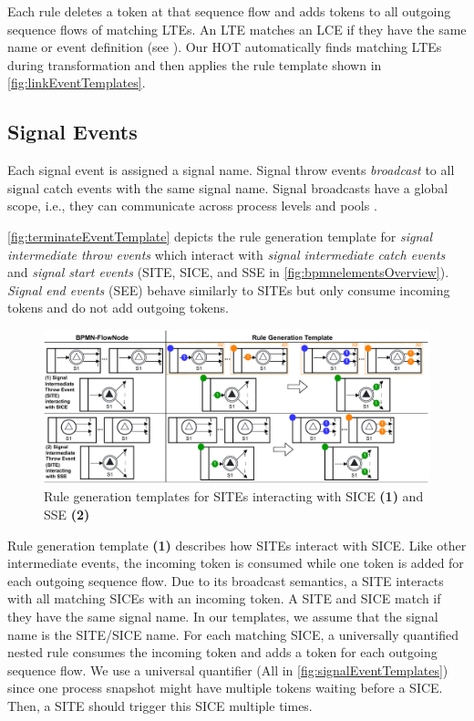 \documentclass{lmcs} %
\begin{document}
Each rule deletes a token at that sequence flow and adds tokens to all outgoing sequence flows of matching LTEs.
An LTE matches an LCE if they have the same name or event definition (see \cite{objectmanagementgroupBusinessProcessModel2013}).
Our HOT automatically finds matching LTEs during transformation and then applies the rule template shown in \autoref{fig:linkEventTemplates}.

\subsection{Signal Events}
Each signal event is assigned a signal name.
Signal throw events \textit{broadcast} to all signal catch events with the same signal name.
Signal broadcasts have a global scope, i.e., they can communicate across process levels and pools \cite{objectmanagementgroupBusinessProcessModel2013}.

\autoref{fig:terminateEventTemplate} depicts the rule generation template for \textit{signal intermediate throw events} which interact with \textit{signal intermediate catch events} and \textit{signal start events} (\textsf{SITE}, \textsf{SICE}, and \textsf{SSE} in \autoref{fig:bpmnelementsOverview}).
\textit{Signal end events} (\textsf{SEE}) behave similarly to SITEs but only consume incoming tokens and do not add outgoing tokens.

\begin{figure}[ht]
    \centering
    \includegraphics[width=1\textwidth]{images/signal_rule_template.pdf}
    \caption{Rule generation templates for SITEs interacting with SICE \textbf{(1)} and SSE \textbf{(2)}}
    \label{fig:signalEventTemplates}
\end{figure}

Rule generation template \textbf{(1)} describes how SITEs interact with SICE.
Like other intermediate events, the incoming token is consumed while one token is added for each outgoing sequence flow.
Due to its broadcast semantics, a SITE interacts with all matching SICEs with an incoming token.
A SITE and SICE match if they have the same signal name.
In our templates, we assume that the signal name is the SITE/SICE name.
For each matching SICE, a universally quantified nested rule consumes the incoming token and adds a token for each outgoing sequence flow.
We use a universal quantifier (\textsf{All} in \autoref{fig:signalEventTemplates}) since one process snapshot might have multiple tokens waiting before a SICE.
Then, a SITE should trigger this SICE multiple times.
\end{document}
